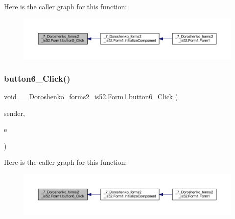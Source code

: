 Here is the caller graph for this function\+:
\nopagebreak
\begin{figure}[H]
\begin{center}
\leavevmode
\includegraphics[width=350pt]{class__7___doroshenko__forms2__is52_1_1_form1_a37aec70c8f5b1bf73b5e91b5f0311817_icgraph}
\end{center}
\end{figure}
\hypertarget{class__7___doroshenko__forms2__is52_1_1_form1_a523f7cc7c91fa861c164b2f57712362d}{}\label{class__7___doroshenko__forms2__is52_1_1_form1_a523f7cc7c91fa861c164b2f57712362d} 
\subsubsection{\texorpdfstring{button6\+\_\+\+Click()}{button6\_Click()}}
{\footnotesize\ttfamily void \+\_\+\_\+\+Doroshenko\+\_\+forms2\+\_\+is52.\+Form1.\+button6\+\_\+\+Click (\begin{DoxyParamCaption}\item[{object}]{sender,  }\item[{Event\+Args}]{e }\end{DoxyParamCaption})\hspace{0.3cm}{\ttfamily [private]}}

Here is the caller graph for this function\+:
\nopagebreak
\begin{figure}[H]
\begin{center}
\leavevmode
\includegraphics[width=350pt]{class__7___doroshenko__forms2__is52_1_1_form1_a523f7cc7c91fa861c164b2f57712362d_icgraph}
\end{center}
\end{figure}
\hypertarget{class__7___doroshenko__forms2__is52_1_1_form1_a08472aa69ab87aa28be496f75ef61c8f}{}\label{class__7___doroshenko__forms2__is52_1_1_form1_a08472aa69ab87aa28be496f75ef61c8f} 
